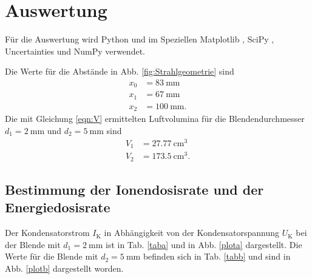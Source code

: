 \section{Auswertung}
\label{sec:Auswertung}

Für die Auswertung wird Python und im Speziellen
Matplotlib \cite{matplotlib}, SciPy \cite{scipy},
Uncertainties \cite{uncertainties} und NumPy \cite{numpy} verwendet.

\noindent Die Werte für die Abstände in Abb. \ref{fig:Strahlgeometrie} sind
\begin{align*}
    x_0 &= \SI{83}{\milli\meter} \\
    x_1 &= \SI{67}{\milli\meter} \\
    x_2 &= \SI{100}{\milli\meter}.
\end{align*}
Die mit Gleichung \eqref{eqn:V} ermittelten Luftvolumina
für die Blendendurchmesser $d_1 = \SI{2}{\milli\meter}$ und
$d_2 = \SI{5}{\milli\meter}$ sind
\begin{align*}
    V_1 &= \SI{27.77}{\centi\meter\cubed} \\ 
    V_2 &= \SI{173.5}{\centi\meter\cubed}.  
\end{align*}


\subsection{Bestimmung der Ionendosisrate und der Energiedosisrate}

Der Kondensatorstrom $I_\text{K}$ in Abhängigkeit von der
Kondensatorspannung $U_\text{K}$ bei der Blende mit
$d_1 = \SI{2}{\milli\meter}$ ist in Tab. \ref{taba} und in Abb. \ref{plota}
dargestellt. Die Werte für die Blende mit 
$d_2 = \SI{5}{\milli\meter}$ befinden sich in Tab. \ref{tabb} und sind in 
Abb. \ref{plotb} dargestellt worden.




